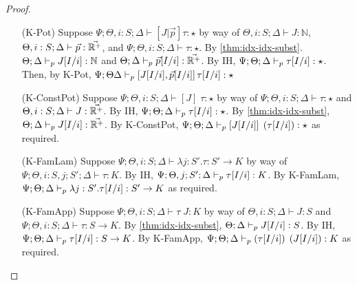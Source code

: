 \begin{proof}
\begin{enumerate}
  \item[(K-Pot)] Suppose
  $\Psi ; \Theta, i : S ; \Delta \vdash [J|\vec{p}] \tau : \star$
  by way of
  $\Theta, i : S ; \Delta \vdash J : \mathbb{N}$,
  $\Theta, i : S ; \Delta \vdash \vec{p} : \vec{\mathbb{R}^+}$, and
  $\Psi ; \Theta, i : S ; \Delta \vdash \tau : \star$.
  By \autoref{thm:idx-idx-subst}.
  $\Theta ; \Delta \vdash_p J[I/i] : \mathbb{N}$ and
  $\Theta ; \Delta \vdash_p \vec{p}[I/i] : \vec{\mathbb{R}^+}$.
  By IH,
  $\Psi ; \Theta ; \Delta \vdash_p \tau[I/i] : \star$.
  Then, by K-Pot,
  $\Psi ; \Theta  \Delta \vdash_p \left[J[I/i],\vec{p}[I/i]\right] \tau[I/i] : \star$
  
  \item[(K-ConstPot)] Suppose
  $\Psi ; \Theta, i : S ; \Delta \vdash [J] \; \tau : \star$
  by way of
  $\Psi ; \Theta, i : S ; \Delta \vdash \tau : \star$ and
  $\Theta, i : S ; \Delta \vdash J : \vec{\mathbb{R}^+}$.
  By IH,
  $\Psi ; \Theta ; \Delta \vdash_p \tau[I/i] : \star$.
  By \autoref{thm:idx-idx-subst},
  $\Theta ; \Delta \vdash_p J[I/i] : \vec{\mathbb{R}^+}$.
  By K-ConstPot,
  $\Psi ; \Theta ; \Delta \vdash_p \left[J[I/i]\right] \; \left(\tau[I/i]\right) : \star$
  as required.
  
  \item[(K-FamLam)] Suppose
  $\Psi ; \Theta, i : S ; \Delta \vdash \lambda j : S'. \tau : S' \to K$
  by way of
  $\Psi ; \Theta, i : S, j ; S' ; \Delta \vdash \tau : K$.
  By IH,
  $\Psi ; \Theta, j ; S' ; \Delta \vdash_p \tau[I/i] : K$.
  By K-FamLam,
  $\Psi ; \Theta ; \Delta \vdash_p \lambda j : S'.\tau[I/i] : S' \to K$
  as required.
  
  \item[(K-FamApp)] Suppose
  $\Psi ; \Theta, i : S ; \Delta \vdash \tau \; J : K$ by way of
  $\Theta, i : S ; \Delta \vdash J : S$ and
  $\Psi ; \Theta, i : S ; \Delta \vdash \tau : S \to K$.
  By \autoref{thm:idx-idx-subst},
  $\Theta ; \Delta \vdash_p J[I/i] : S$.
  By IH,
  $\Psi ; \Theta ; \Delta \vdash_p \tau[I/i] : S \to K$.
  By K-FamApp,
  $\Psi ; \Theta ; \Delta \vdash_p \left(\tau[I/i]\right) \; \left(J[I/i]\right) : K$
  as required.
  
\end{enumerate}
\end{proof}